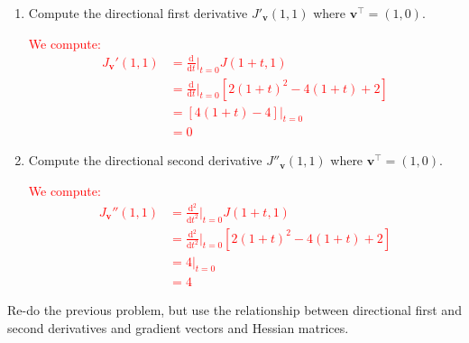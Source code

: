 \documentclass[12pt,reqno]{amsart}
\begin{document}
\begin{enumerate}
\item Compute the directional first derivative $J'_\mathbf{v}(1,1)$ where $\mathbf{v}^\intercal = (1,0)$.

\bigskip
\textcolor{red}{We compute:
\begin{align*}
J_\mathbf{v}'(1,1) &= \frac{\text{d}}{\text{d}t} \Big|_{t=0} J(1+t,1) \\
&= \frac{\text{d}}{\text{d}t} \Big|_{t=0}\left[ 2(1+t)^2 -4(1+t)+2 \right] \\
&= \left[4(1+t) - 4 \right] \big|_{t=0} \\
&= 0
\end{align*}}
\bigskip

\item Compute the directional second derivative $J''_{\mathbf{v}}(1,1)$ where $\mathbf{v}^\intercal = (1,0)$.

\bigskip
\textcolor{red}{We compute:
\begin{align*}
J_\mathbf{v}''(1,1) &= \frac{\text{d}^2}{\text{d}t^2} \Big|_{t=0} J(1+t,1) \\
&= \frac{\text{d}^2}{\text{d}t^2} \Big|_{t=0}\left[ 2(1+t)^2 -4(1+t)+2 \right] \\
&= 4 \big|_{t=0} \\
&= 4
\end{align*}}
\bigskip
\end{enumerate}








\prob Re-do the previous problem, but use the relationship between directional first and second derivatives and gradient vectors and Hessian matrices.
\end{document}

